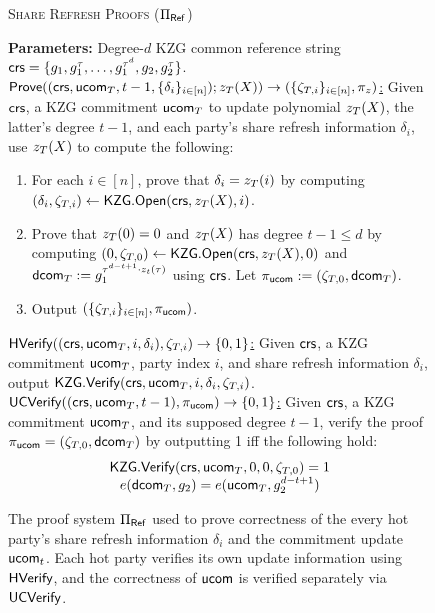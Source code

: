 \begin{figure*}[tbhp]
    \centering
    \begin{mdframed}
    \begin{center}
        \textsc{Share Refresh Proofs ($\Pi_{\sf Ref}$)}
    \end{center}
    \medskip
    \textbf{Parameters:} Degree-$d$ KZG common reference string $\mathsf{crs} = \{g_1, g_1^\tau, \dots,\allowbreak g_1^{\tau^d}, g_2, g_2^\tau\}$.
    \hfill\medskip\\
    \underline{$\mathsf{Prove}((\mathsf{crs}, {\sf u}\mathsf{com}_{T}, t-1, \{\delta_i\}_{i \in [n]}); z_{T}(X)) \to (\{\zeta_{T,i}\}_{i \in [n]}, \pi_z)$:} Given $\mathsf{crs}$, a KZG commitment ${\sf u}\mathsf{com}_{T}$ to update polynomial $z_{T}(X)$, the latter's degree $t-1$, and each party's share refresh information $\delta_i$, use $z_{T}(X)$ to compute the following:
    \begin{enumerate}
        \item For each $i \in [n]$, prove that $\delta_i = z_{T}(i)$ by computing $(\delta_i, \zeta_{T,i}) \gets \mathsf{KZG}.\mathsf{Open}(\mathsf{crs}, z_{T}(X), i)$. 
        \item Prove that $z_{T}(0) = 0$ and $z_{T}(X)$ has degree $t-1 \leq d$ by computing $(0, \zeta_{T,0}) \gets \mathsf{KZG}.\mathsf{Open}(\mathsf{crs}, z_{T}(X), 0)$ and $\mathsf{dcom}_{T} := g_1^{\tau^{d-t+1} \cdot z_t(\tau)}$ using $\mathsf{crs}$. Let $\pi_{\mathsf{ucom}} := (\zeta_{T,0}, \mathsf{dcom}_{T})$. 
        \item Output $(\{\zeta_{T,i}\}_{i \in [n]}, \pi_{\mathsf{ucom}})$.
    \end{enumerate}
    \underline{$\mathsf{H}\mathsf{Verify}((\mathsf{crs}, \mathsf{ucom}_{T}, i, \delta_i), \zeta_{T,i}) \to \{0,1\}$:} Given $\mathsf{crs}$, a KZG commitment $\mathsf{ucom}_{T}$, party index $i$, and share refresh information $\delta_i$, output $\mathsf{KZG}.\mathsf{Verify}(\mathsf{crs}, \mathsf{ucom}_{T}, i, \delta_i, \zeta_{T,i})$.\medskip\\
    \underline{${\sf UC}\mathsf{Verify}((\mathsf{crs}, \mathsf{ucom}_{T}, t-1), \pi_{\mathsf{ucom}}) \to \{0,1\}$:} Given $\mathsf{crs}$, a KZG commitment $\mathsf{ucom}_{T}$, and its supposed degree $t-1$, verify the proof $\pi_{\mathsf{ucom}} = (\zeta_{T,0}, \mathsf{dcom}_{T})$ by outputting 1 iff the following hold:
    \[\begin{array}{c}
        \mathsf{KZG}.\mathsf{Verify}(\mathsf{crs}, \mathsf{ucom}_{T}, 0, 0, \zeta_{T,0}) = 1\\
        e(\mathsf{dcom}_{T}, g_2) = e(\mathsf{ucom}_{T}, g_2^{d-t+1})
    \end{array}\]
    \end{mdframed}
    \caption{The proof system $\Pi_{\sf Ref}$ used to prove correctness of the every hot party's share refresh information $\delta_i$ and the commitment update ${\sf u}\mathsf{com}_t$. Each hot party verifies its own update information using ${\sf H}\mathsf{Verify}$, and the correctness of ${\sf u}\mathsf{com}$ is verified separately via ${\sf UC}\mathsf{Verify}$.}
    \label{fig:pi_ref}
\end{figure*}